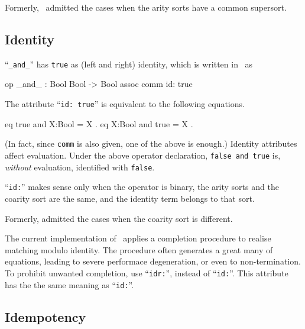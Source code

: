 \documentclass[a4paper]{memoir}
\begin{document}
\begin{warning}
  Formerly, \cafeobj~admitted the cases when
  the arity sorts have a common supersort.
\end{warning}

\subsection{Identity}
``\verb|_and_|'' has \verb|true| as (left and right) identity, which is
written in \cafeobj~as
\begin{vvtm}
\begin{ccode}
   op _and_ : Bool Bool -> Bool { assoc comm id: true }
\end{ccode}
\end{vvtm}
The attribute ``\verb|id: true|'' is equivalent to the following equations.
\begin{vvtm}
\begin{ccode}
   eq true and X:Bool = X .
   eq X:Bool and true = X .
\end{ccode}
\end{vvtm}
(In fact, since \verb|comm| is also given, one of the above is enough.)
Identity attributes affect evaluation. Under the above operator
declaration, \verb|false and true| is, {\em without} evaluation,
identified with \verb|false|.

``\verb|id:|'' makes sense only when the operator is binary,
the arity sorts and the coarity sort are the same, and the identity term
belongs to that sort.

\begin{warning}
  Formerly, \cafeobj
  admitted the cases when the coarity sort is different.
\end{warning}

\begin{warning}
  The current implementation of \cafeobj~applies a completion procedure
  to realise matching modulo identity. The procedure often generates a
  great many of equations, leading to severe performace degeneration,
  or even to non-termination. To prohibit unwanted completion,
  use ``\verb|idr:|'', instead of ``\verb|id:|''.
  This attribute has the the same meaning as ``\verb|id:|''.
\end{warning}

\subsection{Idempotency}
\end{document}
